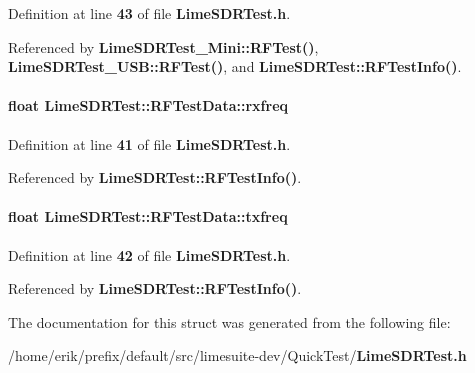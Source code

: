 Definition at line {\bf 43} of file {\bf Lime\+S\+D\+R\+Test.\+h}.



Referenced by {\bf Lime\+S\+D\+R\+Test\+\_\+\+Mini\+::\+R\+F\+Test()}, {\bf Lime\+S\+D\+R\+Test\+\_\+\+U\+S\+B\+::\+R\+F\+Test()}, and {\bf Lime\+S\+D\+R\+Test\+::\+R\+F\+Test\+Info()}.

\paragraph[{rxfreq}]{\setlength{\rightskip}{0pt plus 5cm}float Lime\+S\+D\+R\+Test\+::\+R\+F\+Test\+Data\+::rxfreq}\label{structLimeSDRTest_1_1RFTestData_a4b0a083a13656e82d9c751aa27606c62}


Definition at line {\bf 41} of file {\bf Lime\+S\+D\+R\+Test.\+h}.



Referenced by {\bf Lime\+S\+D\+R\+Test\+::\+R\+F\+Test\+Info()}.

\paragraph[{txfreq}]{\setlength{\rightskip}{0pt plus 5cm}float Lime\+S\+D\+R\+Test\+::\+R\+F\+Test\+Data\+::txfreq}\label{structLimeSDRTest_1_1RFTestData_abd14fb1e2295458b061a84cca811df20}


Definition at line {\bf 42} of file {\bf Lime\+S\+D\+R\+Test.\+h}.



Referenced by {\bf Lime\+S\+D\+R\+Test\+::\+R\+F\+Test\+Info()}.



The documentation for this struct was generated from the following file\+:\begin{DoxyCompactItemize}
\item 
/home/erik/prefix/default/src/limesuite-\/dev/\+Quick\+Test/{\bf Lime\+S\+D\+R\+Test.\+h}\end{DoxyCompactItemize}
